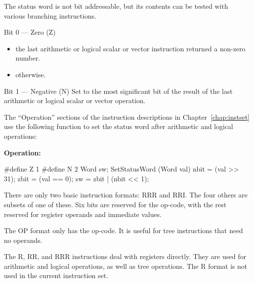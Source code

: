 \documentclass{book}
\begin{document}

The status word is not bit addressable, but its contents can be tested
with various branching instructions.

\begin{indented}{\sc Bit 0 --- Zero (Z)}
  \begin{itemize}
    \item[If 0] the last arithmetic or logical scalar or vector
          instruction returned a non-zero number.
    \item[If 1] otherwise.
  \end{itemize}
\end{indented}
\begin{indented}{\sc Bit 1 --- Negative (N)}
Set to the most significant bit of the result
of the last arithmetic or logical scalar or vector operation.
\end{indented}

\vspace{1ex}

\noindent The ``Operation'' sections of the instruction descriptions in
Chapter~\ref{chap:instset} use the following function to
set the status word after arithmetic and logical operations:

\begin{indented}{\bf Operation:}\vspace{.8ex}
\begin{verbatimtab}
#define Z 1
#define N 2
Word sw;
SetStatusWord (Word val) {
    nbit = (val >> 31);
    zbit = (val == 0);
    sw = zbit | (nbit << 1);
}
\end{verbatimtab}
\end{indented}


There are only two basic instruction formats: RRR and RRI.  The four others
are subsets of one of these.  Six bits are reserved for the op-code,
with the rest reserved for register operands and immediate values.

The OP format only has the op-code.  It is useful for tree instructions
that need no operands.

\vspace{3ex}

\vspace{3ex}
The R, RR, and RRR instructions deal with registers directly.  They are
used for arithmetic and logical operations, as well as tree operations.
The R format is not used in the current instruction set.
\end{document}
